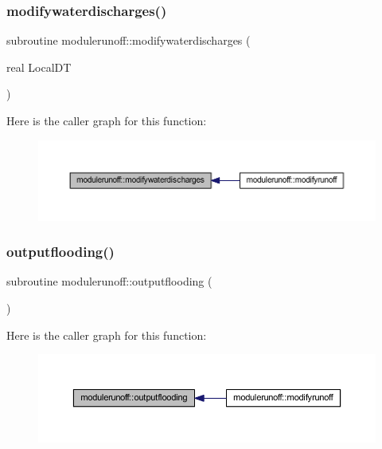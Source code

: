 \subsubsection{\texorpdfstring{modifywaterdischarges()}{modifywaterdischarges()}}
{\footnotesize\ttfamily subroutine modulerunoff\+::modifywaterdischarges (\begin{DoxyParamCaption}\item[{real}]{Local\+DT }\end{DoxyParamCaption})\hspace{0.3cm}{\ttfamily [private]}}

Here is the caller graph for this function\+:
\nopagebreak
\begin{figure}[H]
\begin{center}
\leavevmode
\includegraphics[width=350pt]{namespacemodulerunoff_aadda9f593eae7a9fbebc7ae31f4e847b_icgraph}
\end{center}
\end{figure}
\mbox{\label{namespacemodulerunoff_a61882209b1d8802763f9fb32a5f34a38}} 
\subsubsection{\texorpdfstring{outputflooding()}{outputflooding()}}
{\footnotesize\ttfamily subroutine modulerunoff\+::outputflooding (\begin{DoxyParamCaption}{ }\end{DoxyParamCaption})\hspace{0.3cm}{\ttfamily [private]}}

Here is the caller graph for this function\+:
\nopagebreak
\begin{figure}[H]
\begin{center}
\leavevmode
\includegraphics[width=350pt]{namespacemodulerunoff_a61882209b1d8802763f9fb32a5f34a38_icgraph}
\end{center}
\end{figure}
\mbox{\label{namespacemodulerunoff_ad52912e124d2d30970fdc6d5bd8c15cc}} 
